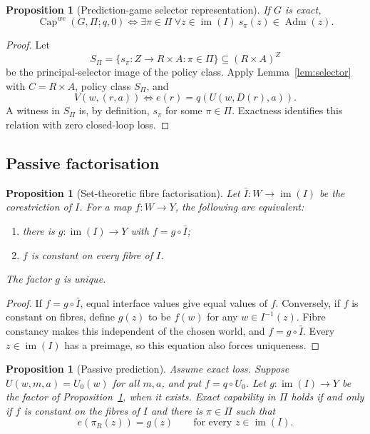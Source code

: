 \documentclass[11pt]{article}
\theoremstyle{plain}
\newtheorem{proposition}[theorem]{Proposition}
\theoremstyle{definition}
\theoremstyle{remark}
\newcommand{\im}{\operatorname{im}}
\newcommand{\Capability}{\operatorname{Cap}}
\newcommand{\Adm}{\operatorname{Adm}}
\begin{document}
\begin{proposition}[Prediction-game selector representation]\label{prop:game-selector}
If $G$ is exact,
\[
\Capability^{wc}(G,\Pi;q,0)
\iff
\exists\pi\in\Pi\ \forall z\in\im(I)\ s_\pi(z)\in\Adm(z).
\]
\end{proposition}

\begin{proof}
Let
\[
S_\Pi=\{s_\pi:Z\to R\times A:\pi\in\Pi\}
\subseteq (R\times A)^Z
\]
be the principal-selector image of the policy class. Apply
Lemma~\ref{lem:selector} with $C=R\times A$, policy class $S_\Pi$, and
\[
V(w,(r,a))\iff e(r)=q(U(w,D(r),a)).
\]
A witness in $S_\Pi$ is, by definition, $s_\pi$ for some $\pi\in\Pi$.
Exactness identifies this relation with zero closed-loop loss.
\end{proof}

\subsection{Passive factorisation}

\begin{proposition}[Set-theoretic fibre factorisation]\label{prop:fibrefactor}
Let $\bar I:W\to\im(I)$ be the corestriction of $I$. For a map $f:W\to Y$,
the following are equivalent:
\begin{enumerate}[label=(\roman*)]
\item there is $g:\im(I)\to Y$ with $f=g\circ\bar I$;
\item $f$ is constant on every fibre of $I$.
\end{enumerate}
The factor $g$ is unique.
\end{proposition}

\begin{proof}
If $f=g\circ\bar I$, equal interface values give equal values of $f$. Conversely,
if $f$ is constant on fibres, define $g(z)$ to be $f(w)$ for any
$w\in I^{-1}(z)$. Fibre constancy makes this independent of the chosen world,
and $f=g\circ\bar I$. Every $z\in\im(I)$ has a preimage, so this equation also
forces uniqueness.
\end{proof}

\begin{proposition}[Passive prediction]\label{prop:passive}
Assume exact loss. Suppose $U(w,m,a)=U_0(w)$ for all $m,a$, and put $f=q\circ U_0$. Let
$g:\im(I)\to Y$ be the factor of Proposition~\ref{prop:fibrefactor}, when it
exists. Exact capability in $\Pi$ holds if and only if $f$ is constant on the
fibres of $I$ and there is $\pi\in\Pi$ such that
\[
e(\pi_R(z))=g(z)\qquad\text{for every }z\in\im(I).
\]
\end{proposition}
\end{document}
